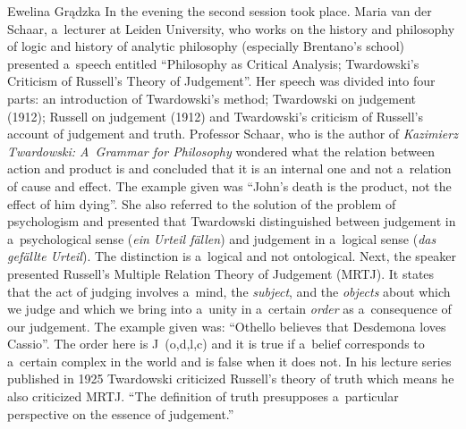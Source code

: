 \begin{editorialeng}{Ewelina Grądzka}
In the evening the second session took place. Maria van der Schaar, a~lecturer at Leiden University, who works on the history and philosophy of logic and history of analytic philosophy (especially Brentano’s school) presented a~speech entitled ``Philosophy as Critical Analysis; Twardowski’s Criticism of Russell’s Theory of Judgement''. Her speech was divided into four parts: an introduction of Twardowski’s method; Twardowski on judgement (1912); Russell on judgement (1912) and Twardowski’s criticism of Russell’s account of judgement and truth. Professor Schaar, who is the author of \textit{Kazimierz Twardowski: A~Grammar for Philosophy}
\parencite*[cf.][]{schaar_kazimierz_2016} %
 wondered what the relation between action and product is and concluded that it is an internal one and not a~relation of cause and effect. The example given was ``John’s death is the product, not the effect of him dying''. She also referred to the solution of the problem of psychologism and presented that Twardowski distinguished between judgement in a~psychological sense (\textit{ein Urteil fällen}) and judgement in a~logical sense (\textit{das gefällte Urteil}). The distinction is a~logical and not ontological. Next, the speaker presented Russell’s Multiple Relation Theory of Judgement (MRTJ). It states that the act of judging involves a~mind, the \textit{subject}, and the \textit{objects} about which we judge and which we bring into a~unity in a~certain \textit{order} as a~consequence of our judgement. The example given was: ``Othello believes that Desdemona loves Cassio''. The order here is J~(o,d,l,c) and it is true if a~belief corresponds to a~certain complex in the world and is false when it does not. In his lecture series published in 1925 
 Twardowski \parencite*[cf.][]{brandl_theory_1999} %
 criticized Russell’s theory of truth which means he also criticized MRTJ. ``The definition of truth presupposes a~particular perspective on the essence of judgement.'' 
\parencite[][]{brandl_theory_1999} %

\end{editorialeng}
